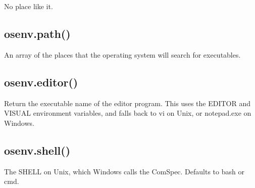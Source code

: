 No place like it.

\subsection*{osenv.\+path()}

An array of the places that the operating system will search for executables.

\subsection*{osenv.\+editor()}

Return the executable name of the editor program. This uses the E\+D\+I\+T\+OR and V\+I\+S\+U\+AL environment variables, and falls back to {\ttfamily vi} on Unix, or {\ttfamily notepad.\+exe} on Windows.

\subsection*{osenv.\+shell()}

The S\+H\+E\+LL on Unix, which Windows calls the Com\+Spec. Defaults to \textquotesingle{}bash\textquotesingle{} or \textquotesingle{}cmd\textquotesingle{}. 